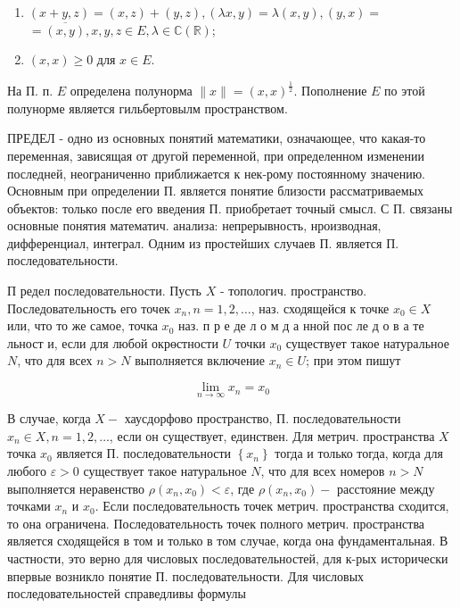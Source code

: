 \documentclass[10pt]{article}
\begin{document}
\begin{enumerate}

  \item $(x+y, z)=(x, z)+(y, z),(\lambda x, y)=\lambda(x, y),(y, x)=$ $=\overline{(x, y)}, x, y, z \in E, \lambda \in \mathbb{C}(\mathbb{R})$;



  \item $(x, x) \geqslant 0$ для $x \in E$.



\end{enumerate}



На П. п. $E$ определена полунорма $\|x\|=(x, x)^{\frac{1}{2}}$. Пополнение $E$ по этой полунорме является гильбертовылм пространством.



ПРЕДЕЛ - одно из основных понятий математики, означающее, что какая-то переменная, зависящая от другой переменной, при определенном изменении последней, неограниченно приближается к нек-рому постоянному значению. Основным при определении П. является понятие близости рассматриваемых объектов: только после его введения П. приобретает точный смысл. С П. связаны основные понятия математич. анализа: непрерывность, нроизводная, дифференциал, интеграл. Одним из простейших случаев П. является П. последовательности.



П редел последовательности. Пусть $X$ - топологич. пространство. Последовательность его точек $x_{n}, n=1,2, \ldots$, наз. сходящейся к точке $x_{0} \in X$ или, что то же самое, точка $x_{0}$ наз. п р е де л о м д а нной пос ле д о в а те льност и, если для любой окрөстности $U$ точки $x_{0}$ существует такое натуральное $N$, что для всех $n>N$ выполняется включение $x_{n} \in U$; при этом пишут



\[

\lim _{n \rightarrow \infty} x_{n}=x_{0}

\]



В случае, когда $X-$ хаусдорфово пространство, П. последовательности $x_{n} \in X, n=1,2, \ldots$, если он существует, единствен. Для метрич. пространства $X$ точка $x_{0}$ является П. последовательности $\left\{x_{n}\right\}$ тогда и только тогда, когда для любого $\varepsilon>0$ существует такое натуральное $N$, что для всех номеров $n>N$ выполняется неравенство $\rho\left(x_{n}, x_{0}\right)<\varepsilon$, где $\rho\left(x_{n}, x_{0}\right)-$ расстояние между точками $x_{n}$ и $x_{0}$. Если последовательность точек метрич. пространства сходится, то она ограничена. Последовательность точек полного метрич. пространства является сходящейся в том и только в том случае, когда она фундаментальная. В частности, это верно для числовых последовательностей, для к-рых исторически впервые возникло понятие П. последовательности. Для числовых последовательностей справедливы формулы
\end{document}
